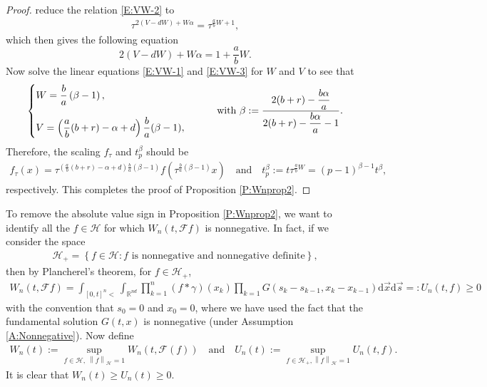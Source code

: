 \documentclass[12pt]{report}
\theoremstyle{plain}
\theoremstyle{definition}
\numberwithin{equation}{section}
\newcommand{\R}{\mathbb{R}}
\newcommand{\Norm}[1]{\left\|  #1   \right\|}
\newcommand{\ud}{\ensuremath{ \mathrm{d} }}
\begin{document}
\begin{proof}
	reduce the relation \eqref{E:VW-2} to
	\begin{align*}
	\tau^{2(V-dW)+W\alpha} = \tau^{\frac{a}{b}W+1},
	\end{align*}
	which then gives the following equation
	\begin{equation} \label{E:VW-3}
	2(V-dW)+W\alpha= 1 + \frac{a}{b}W .
	\end{equation}
	Now solve the linear equations \eqref{E:VW-1} and \eqref{E:VW-3} for $W$ and $V$ to see that
	\begin{align*}
	\begin{cases}
	W = \displaystyle \dfrac{b}{a}\left( \beta -1 \right), \bigskip \\
	V = \displaystyle \left(\frac{a}{b}(b+r)-\alpha +d\right)\frac{b}{a}(\beta -1),
	\end{cases}
	\qquad
	\text{with }\beta := \dfrac{2(b+r)-\dfrac{b\alpha}{a}}{ 2(b+r)-\dfrac{b\alpha}{a} -1 }.
	\end{align*}
	Therefore, the scaling $f_\tau$ and $t_p^\beta$ should be
	\begin{align*}
	f_\tau(x) = \tau^{\left(\frac{a}{b}(b+r)-\alpha+d\right)\frac{b}{a}(\beta -1)} f\left(\tau^{\frac{b}{a}(\beta -1)}x\right)
	\quad \text{and} \quad
	t_p^\beta := t\tau^{\frac{a}{b}W} = (p-1)^{\beta -1} t^\beta,
	\end{align*}
	respectively. This completes the proof of Proposition \ref{P:Wnprop2}.
\end{proof}

To remove the absolute value sign in Proposition \ref{P:Wnprop2}, we want to identify all the $f \in
\mathcal H$ for which $W_n(t,\mathcal{F}f)$ is nonnegative. In fact, if we consider the space
\begin{align*}
\mathcal{H}_+ = \left\{ f\in \mathcal{H} : \text{$f$ is nonnegative and nonnegative definite}\right\},
\end{align*}
then by Plancherel's theorem, for $f\in\mathcal{H}_+$,
\begin{align*}
W_n(t,\mathcal{F}f) = \int_{[0,t]^n<} \int_{\R^{nd}} \prod_{k=1}^n(f*\gamma)(x_k) \prod_{k=1}
G(s_k - s_{k-1}, x_k-x_{k-1}) \ud \vec{x} \ud \vec{s} =: U_n(t,f) \ge 0
\end{align*}
with the convention that $s_0=0$ and $x_0=0$, where we have used the fact that the fundamental
solution $G(t,x)$ is nonnegative (under Assumption \ref{A:Nonnegative}).  Now define
\begin{align*}
W_n(t) := \sup_{f\in\mathcal{H},\: \Norm{f}_{\mathcal{H}}=1} W_n(t,\mathcal{F}(f)) \quad \text{and} \quad
U_n(t) :=  \sup_{f\in\mathcal{H}_+, \Norm{f}_{\mathcal{H}}=1} U_n(t,f).
\end{align*}
It is clear that $W_n(t) \ge U_n(t) \ge 0$.
\end{document}
